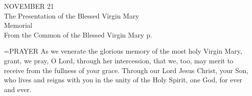 \begin{center}\normalsize NOVEMBER 21\\
\footnotesize The Presentation of the Blessed Virgin Mary\\
\footnotesize Memorial\\
\footnotesize From the Common of the Blessed Virgin Mary p.\\
\end{center}

\hangindent=\parindent \small{PRAYER 
As we venerate the glorious memory
of the most holy Virgin Mary,
grant, we pray, O Lord, through her intercession,
that we, too, may merit to receive
from the fullness of your grace.
Through our Lord Jesus Christ, your Son,
who lives and reigns with you in the unity of the Holy Spirit,
one God, for ever and ever.\\}
 
